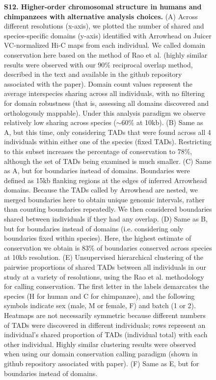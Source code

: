 \begin{figure}[!htb]
\caption[Higher-order chromosomal structure in humans and chimpanzees with alternative analysis choices.]{\textbf{S12. Higher-order chromosomal structure in humans and chimpanzees with alternative analysis choices.} (A) Across different resolutions (x-axis), we plotted the number of shared and species-specific domains (y-axis) identified with Arrowhead \cite{Durand.2016} on Juicer VC-normalized Hi-C maps from each individual. We called domain conservation here based on the method of Rao et al. \cite{Rao.2014} (highly similar results were observed with our 90\% reciprocal overlap method, described in the text and available in the github repository associated with the paper). Domain count values represent the average interspecies sharing across all individuals, with no filtering for domain robustness (that is, assessing all domains discovered and orthologously mappable). Under this analysis paradigm we observe relatively low sharing across species ($\sim$60\% at 10kb). (B) Same as A, but this time, only considering TADs that were found across all 4 individuals within either one of the species (fixed TADs). Restricting to this subset increases the percentage of conservation to 78\%, although the set of TADs being examined is much smaller. (C) Same as A, but for boundaries instead of domains. Boundaries were defined as 15kb flanking regions at the edges of inferred Arrowhead domains. Because the TADs called by Arrowhead are nested, we merged boundaries here to obtain unique genomic intervals, rather than counting boundaries repeatedly. We then considered boundaries shared between individuals if they had any overlap. (D) Same as B, but for boundaries instead of domains (i.e. considering only boundaries fixed within species). Here, the highest estimate of conservation we obtain is 83\% of boundaries conserved across species at 10kb resolution. (E) Unsupervised hierarchical clustering of the pairwise proportions of shared TADs between all individuals in our study at a variety of resolutions, using the Rao et al. \cite{Rao.2014} methodology for calling conservation. The first letter in the labels demarcates the species (H for human and C for chimpanzee), and the following symbols indicate sex (male, M or female, F) and batch (1 or 2). Heatmaps are not necessarily symmetric because different numbers of TADs were discovered in different individuals; rows represent an individual's shared proportion of TADs (individual total) with each other individual. Highly similar clustering results were observed when using our domain conservation calling paradigm (shown in github repository associated with paper). (F) Same as E, but for boundaries instead of domains.}
\label{fig:ch02-figS12}
\end{figure}

